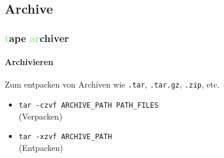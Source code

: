 \documentclass[12pt,utf8]{beamer}
\begin{document}


\subsection{Archive}
\begin{frame}
\frametitle{\textcolor{lightGreen}{t}ape \textcolor{lightGreen}{ar}chiver}
\framesubtitle{Archivieren}
Zum entpacken von Archiven wie \texttt{.tar}, \texttt{.tar.gz}, \texttt{.zip}, etc. 
\begin{itemize}
	\item \texttt{tar -czvf ARCHIVE\_PATH PATH\_FILES}\\(Verpacken)
	\item \texttt{tar -xzvf ARCHIVE\_PATH}\\(Entpacken)
\end{itemize}
\end{frame}
\end{document}
